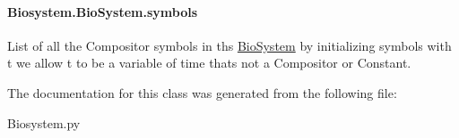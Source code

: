 \paragraph[{\texorpdfstring{symbols}{symbols}}]{\setlength{\rightskip}{0pt plus 5cm}Biosystem.\+Bio\+System.\+symbols}\hypertarget{classBiosystem_1_1BioSystem_a4a04b16611692fee47542e344d7a332d}{}\label{classBiosystem_1_1BioSystem_a4a04b16611692fee47542e344d7a332d}


List of all the Compositor symbols in ths \hyperlink{classBiosystem_1_1BioSystem}{Bio\+System} by initializing symbols with t we allow t to be a variable of time that\textquotesingle{}s not a Compositor or Constant. 



The documentation for this class was generated from the following file\+:\begin{DoxyCompactItemize}
\item 
Biosystem.\+py\end{DoxyCompactItemize}
